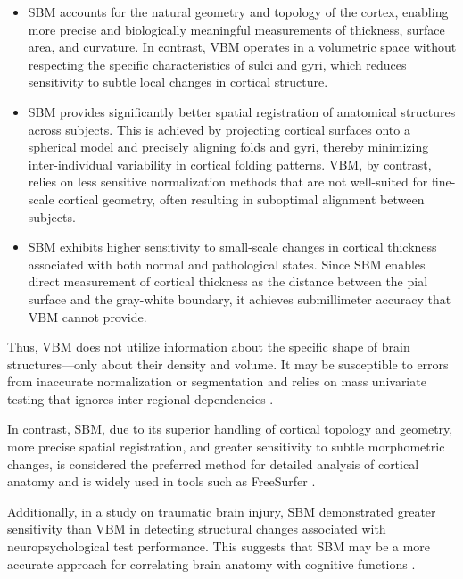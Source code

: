 \documentclass[default]{subfiles}
\begin{document}
\begin{itemize}
    \item SBM accounts for the natural geometry and topology of the cortex, enabling more precise and biologically
    meaningful measurements of thickness, surface area, and curvature. In contrast, VBM operates in a volumetric space
    without respecting the specific characteristics of sulci and gyri, which reduces sensitivity to subtle local
    changes in cortical structure.
    
    \item SBM provides significantly better spatial registration of anatomical structures across subjects. This is
    achieved by projecting cortical surfaces onto a spherical model and precisely aligning folds and gyri, thereby
    minimizing inter-individual variability in cortical folding patterns. VBM, by contrast, relies on less sensitive
    normalization methods that are not well-suited for fine-scale cortical geometry, often resulting in suboptimal
    alignment between subjects.
    
    \item SBM exhibits higher sensitivity to small-scale changes in cortical thickness associated with both normal and
    pathological states. Since SBM enables direct measurement of cortical thickness as the distance between the pial
    surface and the gray-white boundary, it achieves submillimeter accuracy that VBM cannot provide.\newline
\end{itemize}

Thus, VBM does not utilize information about the specific shape of brain structures—only about their density and
volume. It may be susceptible to errors from inaccurate normalization or segmentation and relies on mass univariate
testing that ignores inter-regional dependencies \cite{ashburner_2000, mechelli_2005, callaert_2014}.

In contrast, SBM, due to its superior handling of cortical topology and geometry, more precise spatial registration,
and greater sensitivity to subtle morphometric changes, is considered the preferred method for detailed analysis of
cortical anatomy and is widely used in tools such as FreeSurfer \cite{fischl_2012}.

Additionally, in a study on traumatic brain injury, SBM demonstrated greater sensitivity than VBM in detecting
structural changes associated with neuropsychological test performance. This suggests that SBM may be a more accurate
approach for correlating brain anatomy with cognitive functions \cite{upadhyay_2014}.
\end{document}
